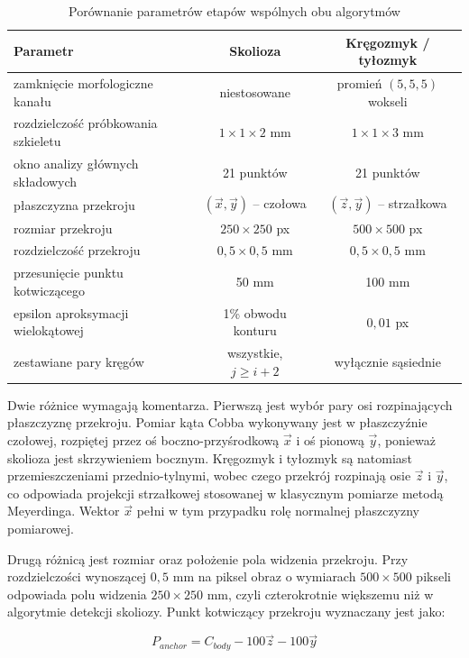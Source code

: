 \begin{table}[H]
\centering
\captionsetup{justification=centering, font=small}
\caption{Porównanie parametrów etapów wspólnych obu algorytmów}
\label{tab:porownanie-parametrow}
\begin{tabular}{lcc}
\hline
\textbf{Parametr} & \textbf{Skolioza} & \textbf{Kręgozmyk / tyłozmyk} \\
\hline
zamknięcie morfologiczne kanału & niestosowane & promień $(5,5,5)$ wokseli \\
rozdzielczość próbkowania szkieletu & $1{\times}1{\times}2$ mm & $1{\times}1{\times}3$ mm \\
okno analizy głównych składowych & 21 punktów & 21 punktów \\
płaszczyzna przekroju & $(\vec{x}, \vec{y})$ -- czołowa & $(\vec{z}, \vec{y})$ -- strzałkowa \\
rozmiar przekroju & $250{\times}250$ px & $500{\times}500$ px \\
rozdzielczość przekroju & $0{,}5{\times}0{,}5$ mm & $0{,}5{\times}0{,}5$ mm \\
przesunięcie punktu kotwiczącego & 50 mm & 100 mm \\
epsilon aproksymacji wielokątowej & 1\% obwodu konturu & $0{,}01$ px \\
zestawiane pary kręgów & wszystkie, $j \geq i+2$ & wyłącznie sąsiednie \\
\hline
\end{tabular}
\end{table}

Dwie różnice wymagają komentarza.
Pierwszą jest wybór pary osi rozpinających płaszczyznę przekroju.
Pomiar kąta Cobba wykonywany jest w płaszczyźnie czołowej, rozpiętej przez oś boczno-przyśrodkową $\vec{x}$ i oś pionową $\vec{y}$, ponieważ skolioza jest skrzywieniem bocznym.
Kręgozmyk i tyłozmyk są natomiast przemieszczeniami przednio-tylnymi, wobec czego przekrój rozpinają osie $\vec{z}$ i $\vec{y}$, co odpowiada projekcji strzałkowej stosowanej w klasycznym pomiarze metodą Meyerdinga.
Wektor $\vec{x}$ pełni w tym przypadku rolę normalnej płaszczyzny pomiarowej.

Drugą różnicą jest rozmiar oraz położenie pola widzenia przekroju.
Przy rozdzielczości wynoszącej $0{,}5$ mm na piksel obraz o wymiarach $500{\times}500$ pikseli odpowiada polu widzenia $250{\times}250$ mm, czyli czterokrotnie większemu niż w algorytmie detekcji skoliozy.
Punkt kotwiczący przekroju wyznaczany jest jako:

\begin{equation} \label{eq:anchor-kregozmyk}
    P_{anchor} = C_{body} - 100\vec{z} - 100\vec{y}
\end{equation}

